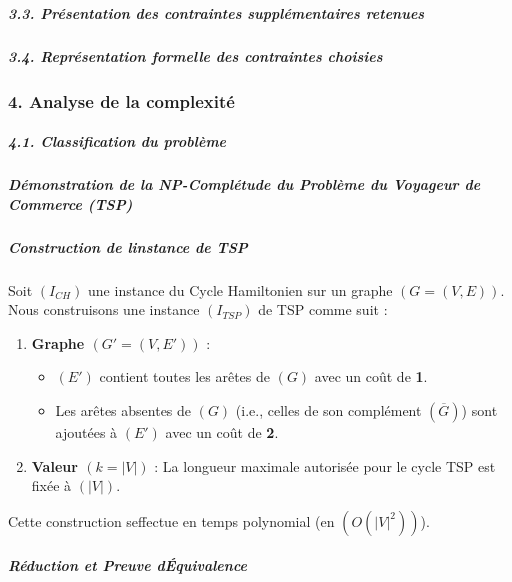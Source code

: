 \subparagraph{3.3. Présentation des contraintes supplémentaires
retenues}\label{33-pruxe9sentation-des-contraintes-suppluxe9mentaires-retenues}

\subparagraph{3.4. Représentation formelle des contraintes
choisies}\label{34-repruxe9sentation-formelle-des-contraintes-choisies}

\protect{}\label{6aa48521}
\subsubsection{4. Analyse de la
complexité}\label{4-analyse-de-la-complexituxe9}

\subparagraph{4.1. Classification du
problème}\label{41-classification-du-probluxe8me}

\subparagraph{\texorpdfstring{\textbf{Démonstration de la NP-Complétude
du Problème du Voyageur de Commerce
(TSP)}}{Démonstration de la NP-Complétude du Problème du Voyageur de Commerce (TSP)}}\label{duxe9monstration-de-la-np-compluxe9tude-du-probluxe8me-du-voyageur-de-commerce-tsp}

\subparagraph{\texorpdfstring{\textbf{Construction de
l\textquotesingle instance de
TSP}}{Construction de l\textquotesingle instance de TSP}}\label{construction-de-linstance-de-tsp}

Soit \((I_{CH})\) une instance du Cycle Hamiltonien sur un graphe
\((G = (V, E))\). Nous construisons une instance \((I_{TSP})\) de TSP
comme suit :

\begin{enumerate}
\tightlist
\item
  \textbf{Graphe \((G' = (V, E'))\)} :

  \begin{itemize}
  \tightlist
  \item
    \((E')\) contient toutes les arêtes de \((G)\) avec un coût de
    \textbf{1}.
  \item
    Les arêtes absentes de \((G)\) (i.e., celles de son complément
    \((\overline{G})\)) sont ajoutées à \((E')\) avec un coût de
    \textbf{2}.
  \end{itemize}
\item
  \textbf{Valeur \((k = |V|)\)} : La longueur maximale autorisée pour le
  cycle TSP est fixée à \((|V|)\).
\end{enumerate}

Cette construction s\textquotesingle effectue en temps polynomial (en
\((O(|V|^2))\)).

\subparagraph{\texorpdfstring{\textbf{Réduction et Preuve
d\textquotesingle Équivalence}}{Réduction et Preuve d\textquotesingle Équivalence}}\label{ruxe9duction-et-preuve-duxe9quivalence}

